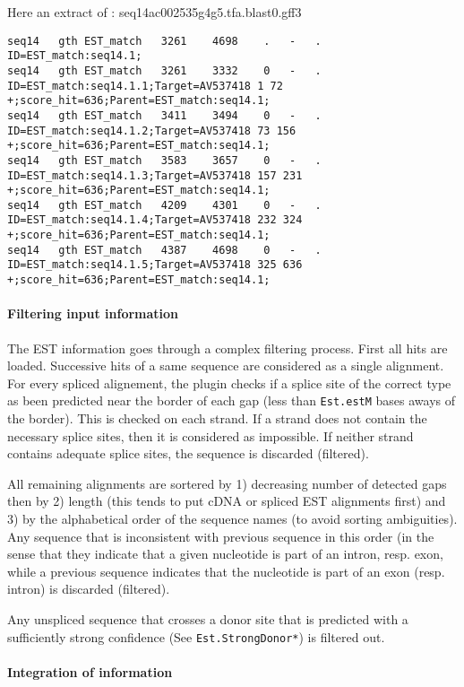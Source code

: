 Here an extract of : seq14ac002535g4g5.tfa.blast0.gff3
\begin{Verbatim}[fontsize=\tiny]
seq14	gth	EST_match	3261	4698	.	-	.	ID=EST_match:seq14.1;
seq14	gth	EST_match	3261	3332	0	-	.	ID=EST_match:seq14.1.1;Target=AV537418 1 72 +;score_hit=636;Parent=EST_match:seq14.1;
seq14	gth	EST_match	3411	3494	0	-	.	ID=EST_match:seq14.1.2;Target=AV537418 73 156 +;score_hit=636;Parent=EST_match:seq14.1;
seq14	gth	EST_match	3583	3657	0	-	.	ID=EST_match:seq14.1.3;Target=AV537418 157 231 +;score_hit=636;Parent=EST_match:seq14.1;
seq14	gth	EST_match	4209	4301	0	-	.	ID=EST_match:seq14.1.4;Target=AV537418 232 324 +;score_hit=636;Parent=EST_match:seq14.1;
seq14	gth	EST_match	4387	4698	0	-	.	ID=EST_match:seq14.1.5;Target=AV537418 325 636 +;score_hit=636;Parent=EST_match:seq14.1;
\end{Verbatim}


\paragraph{Filtering input information}

The EST information goes through a complex filtering process. First
all hits are loaded. Successive hits of a same sequence are considered
as a single alignment.  For every spliced alignement, the plugin
checks if a splice site of the correct type as been predicted near the
border of each gap (less than \texttt{Est.estM} bases aways of the
border). This is checked on each strand. If a strand does not contain
the necessary splice sites, then it is considered as impossible. If
neither strand contains adequate splice sites, the sequence is
discarded (filtered).

All remaining alignments are sortered by 1) decreasing number of
detected gaps then by 2) length (this tends to put cDNA or spliced EST
alignments first) and 3) by the alphabetical order of the sequence
names (to avoid sorting ambiguities). Any sequence that is
inconsistent with previous sequence in this order (in the sense that
they indicate that a given nucleotide is part of an intron, resp.
exon, while a previous sequence indicates that the nucleotide is part
of an exon (resp. intron) is discarded (filtered).

Any unspliced sequence that crosses a donor site that is predicted
with a sufficiently strong confidence (See \texttt{Est.StrongDonor*})
is filtered out.

\paragraph{Integration of information}

